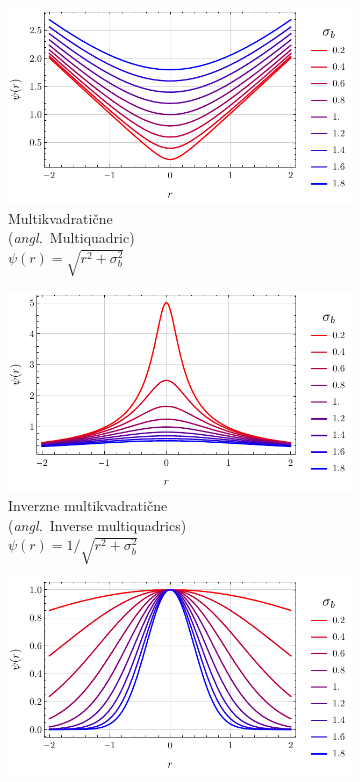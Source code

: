 \documentclass[12pt,a4paper,twoside]{article}
\theoremstyle{definition} %
\theoremstyle{plain} %
\numberwithin{equation}{section}
\newcommand{\ang}[1]{(\hspace{-1.5px}\textit{angl.}\ #1)}
\begin{document}
\begin{figure}[h]
  \centering
  \begin{subfigure}[t]{0.33\textwidth}
    \includegraphics[width=\textwidth]{images/rbf_mq.pdf}
    \caption[Multikvadratične]{Multikvadratične \\ \ang{Multiquadric}  \\ $\psi(r) = \sqrt{r^2+\sigma_b^2}$}
  \end{subfigure}
  \begin{subfigure}[t]{0.33\textwidth}
    \includegraphics[width=\textwidth]{images/rbf_imq.pdf}
    \caption[Inverzne multikvadratične]{Inverzne multikvadratične \\ \ang{Inverse multiquadrics}  \\ $\psi(r) = 1 / \sqrt{r^2+\sigma_b^2}$}
  \end{subfigure}
  \begin{subfigure}[t]{0.32\textwidth}
    \includegraphics[width=\textwidth]{images/rbf_gau.pdf}

\end{subfigure}
\end{figure}
\end{document}
